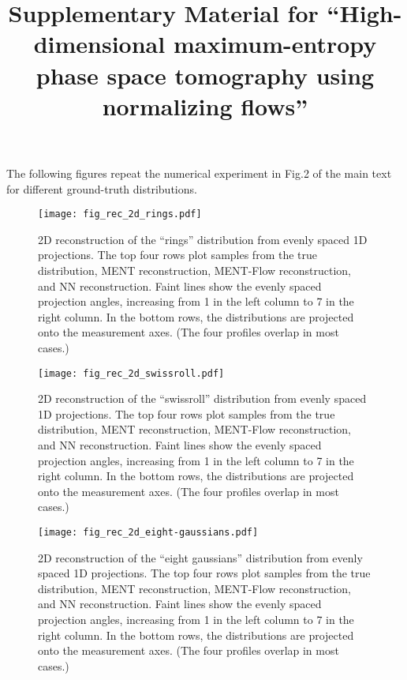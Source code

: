 \documentclass[%
    reprint,
    onecolumn,
    nofootinbib,
    amsmath,
    amssymb,
    aps,
    prstab,
]{revtex4-2}
\begin{document}
\title{Supplementary Material for ``High-dimensional maximum-entropy phase space tomography using normalizing flows''}


\maketitle

The following figures repeat the numerical experiment in Fig.2 of the main text for different ground-truth distributions.

%
\begin{figure*}
    \centering
    \texttt{[image: fig\_rec\_2d\_rings.pdf]}
    \caption{2D reconstruction of the ``rings'' distribution from evenly spaced 1D projections. The top four rows plot samples from the true distribution, MENT reconstruction, MENT-Flow reconstruction, and NN reconstruction. Faint lines show the evenly spaced projection angles, increasing from 1 in the left column to 7 in the right column. In the bottom rows, the distributions are projected onto the measurement axes. (The four profiles overlap in most cases.)}
    \label{fig:rec_2d_rings}
\end{figure*}
%
%
\begin{figure*}
    \centering
    \texttt{[image: fig\_rec\_2d\_swissroll.pdf]}
    \caption{2D reconstruction of the ``swissroll'' distribution from evenly spaced 1D projections. The top four rows plot samples from the true distribution, MENT reconstruction, MENT-Flow reconstruction, and NN reconstruction. Faint lines show the evenly spaced projection angles, increasing from 1 in the left column to 7 in the right column. In the bottom rows, the distributions are projected onto the measurement axes. (The four profiles overlap in most cases.)}
    \label{fig:rec_2d_swissroll}
\end{figure*}
%
%
\begin{figure*}
    \centering
    \texttt{[image: fig\_rec\_2d\_eight-gaussians.pdf]}
    \caption{2D reconstruction of the ``eight gaussians'' distribution from evenly spaced 1D projections. The top four rows plot samples from the true distribution, MENT reconstruction, MENT-Flow reconstruction, and NN reconstruction. Faint lines show the evenly spaced projection angles, increasing from 1 in the left column to 7 in the right column. In the bottom rows, the distributions are projected onto the measurement axes. (The four profiles overlap in most cases.)}
    \label{fig:rec_2d_eight-gaussians}
\end{figure*}
\end{document}
